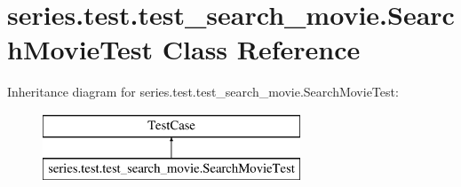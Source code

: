 \hypertarget{classseries_1_1test_1_1test__search__movie_1_1_search_movie_test}{}\section{series.\+test.\+test\+\_\+search\+\_\+movie.\+Search\+Movie\+Test Class Reference}
\label{classseries_1_1test_1_1test__search__movie_1_1_search_movie_test}
Inheritance diagram for series.\+test.\+test\+\_\+search\+\_\+movie.\+Search\+Movie\+Test\+:\begin{figure}[H]
\begin{center}
\leavevmode
\includegraphics[height=2.000000cm]{classseries_1_1test_1_1test__search__movie_1_1_search_movie_test}
\end{center}
\end{figure}
